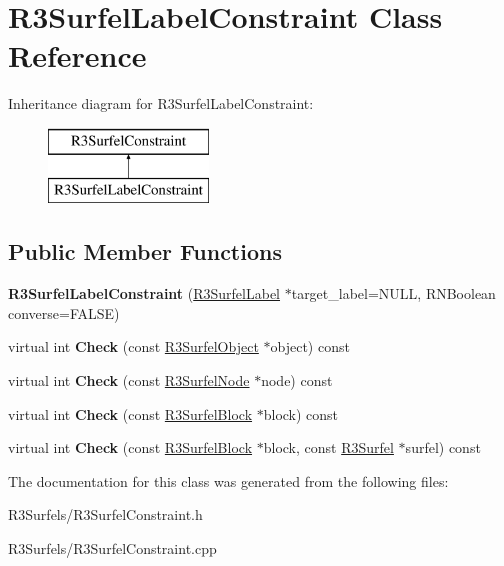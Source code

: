 \hypertarget{class_r3_surfel_label_constraint}{}\section{R3\+Surfel\+Label\+Constraint Class Reference}
\label{class_r3_surfel_label_constraint}
Inheritance diagram for R3\+Surfel\+Label\+Constraint\+:\begin{figure}[H]
\begin{center}
\leavevmode
\includegraphics[height=2.000000cm]{class_r3_surfel_label_constraint}
\end{center}
\end{figure}
\subsection*{Public Member Functions}
\begin{DoxyCompactItemize}
\item 
{\bfseries R3\+Surfel\+Label\+Constraint} (\hyperlink{class_r3_surfel_label}{R3\+Surfel\+Label} $\ast$target\+\_\+label=N\+U\+LL, R\+N\+Boolean converse=F\+A\+L\+SE)\hypertarget{class_r3_surfel_label_constraint_a9a53701580bee43b2bafea95004e2803}{}\label{class_r3_surfel_label_constraint_a9a53701580bee43b2bafea95004e2803}

\item 
virtual int {\bfseries Check} (const \hyperlink{class_r3_surfel_object}{R3\+Surfel\+Object} $\ast$object) const \hypertarget{class_r3_surfel_label_constraint_a203831fe20513e99a9485f9347200ff3}{}\label{class_r3_surfel_label_constraint_a203831fe20513e99a9485f9347200ff3}

\item 
virtual int {\bfseries Check} (const \hyperlink{class_r3_surfel_node}{R3\+Surfel\+Node} $\ast$node) const \hypertarget{class_r3_surfel_label_constraint_a888a2876808c2a36710373205c0c3ee3}{}\label{class_r3_surfel_label_constraint_a888a2876808c2a36710373205c0c3ee3}

\item 
virtual int {\bfseries Check} (const \hyperlink{class_r3_surfel_block}{R3\+Surfel\+Block} $\ast$block) const \hypertarget{class_r3_surfel_label_constraint_acc5535d71d57631b2637e9389fe7c56a}{}\label{class_r3_surfel_label_constraint_acc5535d71d57631b2637e9389fe7c56a}

\item 
virtual int {\bfseries Check} (const \hyperlink{class_r3_surfel_block}{R3\+Surfel\+Block} $\ast$block, const \hyperlink{class_r3_surfel}{R3\+Surfel} $\ast$surfel) const \hypertarget{class_r3_surfel_label_constraint_ab88001637c1d280367f16ddff82c4fe6}{}\label{class_r3_surfel_label_constraint_ab88001637c1d280367f16ddff82c4fe6}

\end{DoxyCompactItemize}


The documentation for this class was generated from the following files\+:\begin{DoxyCompactItemize}
\item 
R3\+Surfels/R3\+Surfel\+Constraint.\+h\item 
R3\+Surfels/R3\+Surfel\+Constraint.\+cpp\end{DoxyCompactItemize}
